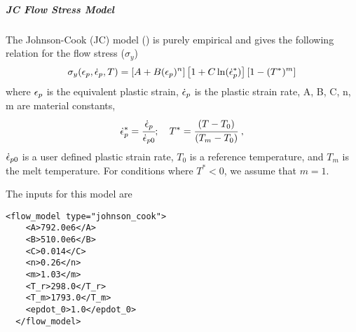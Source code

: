   \subparagraph{JC Flow Stress Model}
  The Johnson-Cook (JC) model (\cite{Johnson83}) is purely empirical and gives
  the following relation for the flow stress ($\sigma_y$)
  \begin{equation}
    \sigma_y(\Ep,\Epdot{},T) = 
    \left[A + B (\Ep)^n\right]\left[1 + C \ln(\Epdot{}^{*})\right]
    \left[1 - (T^*)^m\right]
  \end{equation}
  where $\Ep$ is the equivalent plastic strain, $\Epdot{}$ is the
  plastic strain rate, A, B, C, n, m are material constants,
  \begin{equation}
    \Epdot{}^{*} = \cfrac{\Epdot{}}{\Epdot{0}}; \quad
    T^* = \cfrac{(T-T_0)}{(T_m-T_0)}~,
  \end{equation}
  $\Epdot{0}$ is a user defined plastic strain rate,
  $T_0$ is a reference temperature, and $T_m$ is the melt temperature.
  For conditions where $T^* < 0$, we assume that $m = 1$.

  The inputs for this model are
  \begin{Verbatim}[fontsize=\footnotesize]
  <flow_model type="johnson_cook">
    <A>792.0e6</A>
    <B>510.0e6</B>
    <C>0.014</C>
    <n>0.26</n>
    <m>1.03</m>
    <T_r>298.0</T_r>
    <T_m>1793.0</T_m>
    <epdot_0>1.0</epdot_0>
  </flow_model>
  \end{Verbatim}

